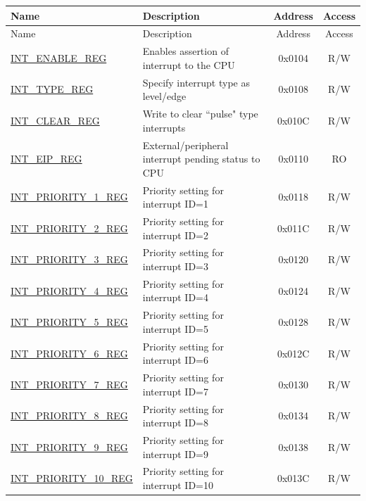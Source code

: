 
\begin{longtable}{ | p{4.0cm} | p{8.4cm} | c | c| }
\hline\rowcolor{lightgray}
Name & Description & Address & Access \\ \hline
\endfirsthead
\hline
\rowcolor{lightgray}
Name & Description & Address & Access  \\
\hline
\endhead
\endfoot

\hyperref[regdesc:INTENABLEREG] {INT\_ENABLE\_REG} & Enables assertion of interrupt to the CPU & 0x0104 & R/W \\\hline
\hyperref[regdesc:INTTYPEREG]{INT\_TYPE\_REG} & Specify interrupt type as level/edge & 0x0108 & R/W \\\hline
\hyperref[regdesc:INTCLEARREG] {INT\_CLEAR\_REG} & Write to clear ``pulse" type interrupts & 0x010C & R/W \\\hline
\hyperref[regdesc:INTEIPREG]{INT\_EIP\_REG} & External/peripheral interrupt pending status to CPU & 0x0110 & RO \\\hline
\hyperref[regdesc:INTPRIORITYREG]{INT\_PRIORITY\_1\_REG} & Priority setting for interrupt ID=1 & 0x0118 & R/W \\\hline
\hyperref[regdesc:INTPRIORITYREG]{INT\_PRIORITY\_2\_REG} & Priority setting for interrupt ID=2 & 0x011C & R/W \\\hline
\hyperref[regdesc:INTPRIORITYREG]{INT\_PRIORITY\_3\_REG} & Priority setting for interrupt ID=3 & 0x0120 & R/W \\\hline
\hyperref[regdesc:INTPRIORITYREG]{INT\_PRIORITY\_4\_REG} & Priority setting for interrupt ID=4 & 0x0124 & R/W \\\hline
\hyperref[regdesc:INTPRIORITYREG]{INT\_PRIORITY\_5\_REG} & Priority setting for interrupt ID=5 & 0x0128 & R/W \\\hline
\hyperref[regdesc:INTPRIORITYREG]{INT\_PRIORITY\_6\_REG} & Priority setting for interrupt ID=6 & 0x012C & R/W \\\hline
\hyperref[regdesc:INTPRIORITYREG]{INT\_PRIORITY\_7\_REG} & Priority setting for interrupt ID=7 & 0x0130 & R/W \\\hline
\hyperref[regdesc:INTPRIORITYREG]{INT\_PRIORITY\_8\_REG} & Priority setting for interrupt ID=8 & 0x0134 & R/W \\\hline
\hyperref[regdesc:INTPRIORITYREG]{INT\_PRIORITY\_9\_REG} & Priority setting for interrupt ID=9 & 0x0138 & R/W \\\hline
\hyperref[regdesc:INTPRIORITYREG]{INT\_PRIORITY\_10\_REG} & Priority setting for interrupt ID=10 & 0x013C & R/W \\\hline

\end{longtable}
